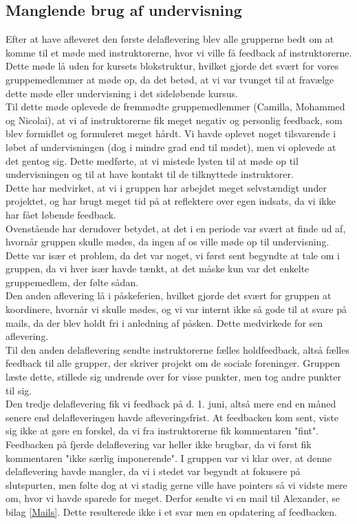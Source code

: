 \documentclass[]{article}
\begin{document}
\subsection{Manglende brug af undervisning}
Efter at have afleveret den første delaflevering blev alle grupperne bedt om at komme til et møde med instruktorerne, hvor vi ville få feedback af instruktorerne. Dette møde lå uden for kursets blokstruktur, hvilket gjorde det svært for vores gruppemedlemmer at møde op, da det betød, at vi var tvunget til at fravælge dette møde eller undervisning i det sideløbende kursus. \\
Til dette møde oplevede de fremmødte gruppemedlemmer (Camilla, Mohammed og Nicolai), at vi af instruktorerne fik meget negativ og personlig feedback, som blev formidlet og formuleret meget hårdt. Vi havde oplevet noget tilsvarende i løbet af undervisningen (dog i mindre grad end til mødet), men vi oplevede at det gentog sig. Dette medførte, at vi mistede lysten til at møde op til undervisningen og til at have kontakt til de tilknyttede instruktorer.\\
Dette har medvirket, at vi i gruppen har arbejdet meget selvstændigt under projektet, og har brugt meget tid på at reflektere over egen indsats, da vi ikke har fået løbende feedback.\\
Ovenstående har derudover betydet, at det i en periode var svært at finde ud af, hvornår gruppen skulle mødes, da ingen af os ville møde op til undervisning. Dette var især et problem, da det var noget, vi først sent begyndte at tale om i gruppen, da vi hver især havde tænkt, at det måske kun var det enkelte gruppemedlem, der følte sådan. \\
Den anden aflevering lå i påskeferien, hvilket gjorde det svært for gruppen at koordinere, hvornår vi skulle mødes, og vi var internt ikke så gode til at svare på mails, da der blev holdt fri i anledning af påsken. Dette medvirkede for sen aflevering.\\ 
\indent Til den anden delaflevering sendte instruktorerne fælles holdfeedback, altså fælles feedback til alle grupper, der skriver projekt om de sociale foreninger. Gruppen læste dette, stillede sig undrende over for visse punkter, men tog andre punkter til sig. \\
Den tredje delaflevering fik vi feedback på d. 1. juni, altså mere end en måned senere end delafleveringen havde afleveringsfrist. At feedbacken kom sent, viste sig ikke at gøre en forskel, da vi fra instruktorerne fik kommentaren "fint".\\
Feedbacken på fjerde delaflevering var heller ikke brugbar, da vi først fik kommentaren "ikke særlig imponerende". I gruppen var vi klar over, at denne delaflevering havde mangler, da vi i stedet var begyndt at fokusere på slutspurten, men følte dog at vi stadig gerne ville have pointers så vi vidste mere om, hvor vi havde sparede for meget. Derfor sendte vi en mail til Alexander, se bilag \ref{Mails}. Dette resulterede ikke i et svar men en opdatering af feedbacken.
\end{document}
